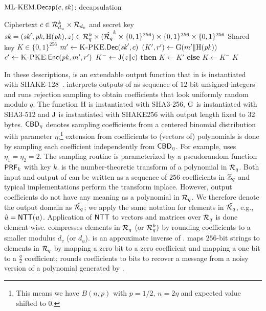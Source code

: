\begin{algorithm}[tb]
  \caption{$\text{{ML-KEM}}.\mathsf{Decap}(c,\mathit{sk})$: decapsulation}
  \label{alg:ccadec}
  \begin{algorithmic}[1]
    \Require Ciphertext $c \in \mathcal{R}_{d_u}^k \times \mathcal{R}_{d_v}$ and secret key $\mathit{sk} = (\mathit{sk}', \mathit{pk}, \text{H}(\mathit{pk}), z) \in \mathcal{R}_q^k \times (\hat{\mathcal{R}_q}^k \times \{0,1\}^{256}) \times \{0,1\}^{256} \times \{0,1\}^{256}$
    \Ensure Shared key $K \in \{0,1\}^{256}$
    \State $m'\gets \text{{\sc K-PKE}}.\mathsf{Dec}(\mathit{sk}',c)$
    \State $(K',r') \gets \text{G}(m'\Vert \text{H}(\mathit{pk}))$
    \State $c' \gets \text{{\sc K-PKE}}.\mathsf{Enc}(\mathit{pk}, m', r')$
    \State $K^- \gets \text{J}(z\Vert c)$
     \textbf{then} $K \gets K'$ \textbf{else} $K \gets K^-$
    \EndIf 
    \State \Return $K$
  \end{algorithmic}
\end{algorithm}




In these descriptions, \XOF is an extendable output function that in 
\mlkem is instantiated with SHAKE-128~\cite{fips202}. 
\Parse interprets outputs of \XOF as sequence of $12$-bit unsigned integers 
and runs rejection sampling to obtain coefficients that look uniformly random modulo $q$. 
The function $\text{H}$ is instantiated with SHA3-256, $\text{G}$ is instantiated with SHA3-512
and $\text{J}$ is instantiated with SHAKE256 with output length fixed to 32 bytes.
$\mathsf{CBD}_\eta$ denotes sampling coefficients from a centered 
binomial distribution with parameter $\eta$;\footnote{This means we have $B(n,p)$ with $p=1/2$, 
$n=2\eta$ and expected value shifted to $0$.}
extension from coefficients to (vectors of) polynomials is done by sampling each
coefficient independently from $\mathsf{CBD}_\eta$. For example, \mlkemmid uses $\eta_1 = \eta_2 = 2$.
The sampling routine is parameterized by a pseudorandom function $\mathsf{PRF}_k$ with key $k$.
\NTT is the number-theoretic transform of a polynomial in $\mathcal{R}_q$. 
Both input and output of \NTT can be written as a sequence of $256$ coefficients
in $\mathbb{Z}_q$ and typical implementations perform the transform inplace. 
However, output coefficients do not have any meaning as a polynomial in $\mathcal{R}_q$.
We therefore denote the output domain as $\hat{\mathcal{R}_q}$; we apply
the same notation for elements in $\hat{\mathcal{R}_q}$, e.g., $\hat{u} = \mbox{\textsf{NTT}}(u)$.
Application of $\mbox{\textsf{NTT}}$ to vectors and matrices over $\mathcal{R}_q$ is done element-wise.
\KyberCompress compresses elements in $\mathcal{R}_q$ (or $\mathcal{R}_q^k)$ by rounding coefficients 
to a smaller modulus $d_v$ (or $d_u$).
\KyberDecompress is an approximate inverse of \KyberCompress.
\ToPoly maps $256$-bit strings to elements in $\mathcal{R}_q$ by mapping a zero bit to
a zero coefficient and mapping a one bit to a $\frac{q}{2}$ coefficient;
\ToMsg rounds coefficients to bits to recover a message from a noisy version
of a polynomial generated by \ToPoly.

